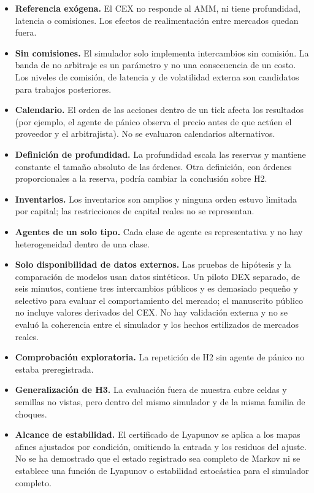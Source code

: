 \begin{itemize}
  \item \textbf{Referencia exógena.} El CEX no responde al AMM, ni tiene profundidad, latencia o comisiones. Los efectos de realimentación entre mercados quedan fuera.
  \item \textbf{Sin comisiones.} El simulador solo implementa intercambios sin comisión. La banda de no arbitraje es un parámetro y no una consecuencia de un costo. Los niveles de comisión, de latencia y de volatilidad externa son candidatos para trabajos posteriores.
  \item \textbf{Calendario.} El orden de las acciones dentro de un tick afecta los resultados (por ejemplo, el agente de pánico observa el precio antes de que actúen el proveedor y el arbitrajista). No se evaluaron calendarios alternativos.
  \item \textbf{Definición de profundidad.} La profundidad escala las reservas y mantiene constante el tamaño absoluto de las órdenes. Otra definición, con órdenes proporcionales a la reserva, podría cambiar la conclusión sobre H2.
  \item \textbf{Inventarios.} Los inventarios son amplios y ninguna orden estuvo limitada por capital; las restricciones de capital reales no se representan.
  \item \textbf{Agentes de un solo tipo.} Cada clase de agente es representativa y no hay heterogeneidad dentro de una clase.
  \item \textbf{Solo disponibilidad de datos externos.} Las pruebas de hipótesis y la comparación de modelos usan datos sintéticos. Un piloto DEX separado, de seis minutos, contiene tres intercambios públicos y es demasiado pequeño y selectivo para evaluar el comportamiento del mercado; el manuscrito público no incluye valores derivados del CEX. No hay validación externa y no se evaluó la coherencia entre el simulador y los hechos estilizados de mercados reales.
  \item \textbf{Comprobación exploratoria.} La repetición de H2 sin agente de pánico no estaba preregistrada.
  \item \textbf{Generalización de H3.} La evaluación fuera de muestra cubre celdas y semillas no vistas, pero dentro del mismo simulador y de la misma familia de choques.
  \item \textbf{Alcance de estabilidad.} El certificado de Lyapunov se aplica a los mapas afines ajustados por condición, omitiendo la entrada y los residuos del ajuste. No se ha demostrado que el estado registrado sea completo de Markov ni se establece una función de Lyapunov o estabilidad estocástica para el simulador completo.
\end{itemize}
